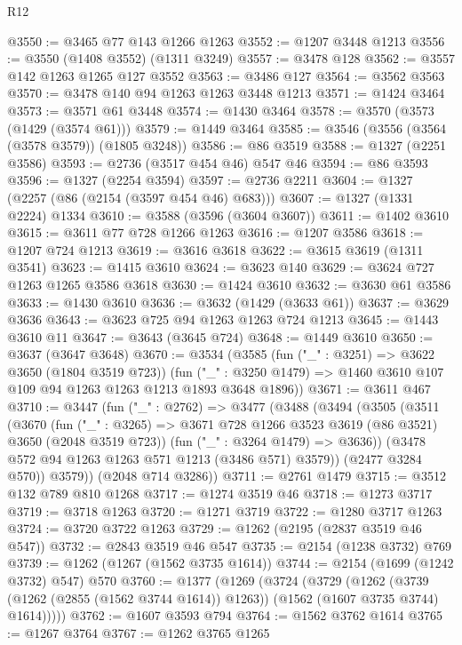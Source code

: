 \begin{lexlean}{R12}
\begin{coremodule}
@3550 := @3465 @77 @143 @1266 @1263
@3552 := @1207 @3448 @1213
@3556 := @3550 (@1408 @3552) (@1311 @3249)
@3557 := @3478 @128
@3562 := @3557 @142 @1263 @1265 @127 @3552
@3563 := @3486 @127
@3564 := @3562 @3563
@3570 := @3478 @140 @94 @1263 @1263 @3448 @1213
@3571 := @1424 @3464
@3573 := @3571 @61 @3448
@3574 := @1430 @3464
@3578 := @3570 (@3573 (@1429 (@3574 @61)))
@3579 := @1449 @3464
@3585 := @3546 (@3556 (@3564 (@3578 @3579)) (@1805 @3248))
@3586 := @86 @3519
@3588 := @1327 (@2251 @3586)
@3593 := @2736 (@3517 @454 @46) @547 @46
@3594 := @86 @3593
@3596 := @1327 (@2254 @3594)
@3597 := @2736 @2211
@3604 := @1327 (@2257 (@86 (@2154 (@3597 @454 @46) @683)))
@3607 := @1327 (@1331 @2224) @1334
@3610 := @3588 (@3596 (@3604 @3607))
@3611 := @1402 @3610
@3615 := @3611 @77 @728 @1266 @1263
@3616 := @1207 @3586
@3618 := @1207 @724 @1213
@3619 := @3616 @3618
@3622 := @3615 @3619 (@1311 @3541)
@3623 := @1415 @3610
@3624 := @3623 @140
@3629 := @3624 @727 @1263 @1265 @3586 @3618
@3630 := @1424 @3610
@3632 := @3630 @61 @3586
@3633 := @1430 @3610
@3636 := @3632 (@1429 (@3633 @61))
@3637 := @3629 @3636
@3643 := @3623 @725 @94 @1263 @1263 @724 @1213
@3645 := @1443 @3610 @11
@3647 := @3643 (@3645 @724)
@3648 := @1449 @3610
@3650 := @3637 (@3647 @3648)
@3670 := @3534
    (@3585
      (fun ("_" : @3251) => @3622 @3650 (@1804 @3519 @723))
      (fun ("_" : @3250 @1479) => @1460 @3610 @107 @109 @94 @1263 @1263 @1213 @1893 @3648 @1896))
@3671 := @3611 @467
@3710 := @3447
    (fun ("_" : @2762) =>
    @3477
      (@3488
        (@3494
          (@3505
            (@3511
              (@3670
                (fun ("_" : @3265) =>
                @3671 @728 @1266 @3523 @3619 (@86 @3521) @3650 (@2048 @3519 @723))
                (fun ("_" : @3264 @1479) => @3636))
              (@3478 @572 @94 @1263 @1263 @571 @1213 (@3486 @571) @3579))
            (@2477 @3284 @570))
          @3579))
      (@2048 @714 @3286))
@3711 := @2761 @1479
@3715 := @3512 @132 @789 @810 @1268
@3717 := @1274 @3519 @46
@3718 := @1273 @3717
@3719 := @3718 @1263
@3720 := @1271 @3719
@3722 := @1280 @3717 @1263
@3724 := @3720 @3722 @1263
@3729 := @1262 (@2195 (@2837 @3519 @46 @547))
@3732 := @2843 @3519 @46 @547
@3735 := @2154 (@1238 @3732) @769
@3739 := @1262 (@1267 (@1562 @3735 @1614))
@3744 := @2154 (@1699 (@1242 @3732) @547) @570
@3760 := @1377
    (@1269
      (@3724
        (@3729
          (@1262
            (@3739 (@1262 (@2855 (@1562 @3744 @1614)) @1263))
            (@1562 (@1607 @3735 @3744) @1614)))))
@3762 := @1607 @3593 @794
@3764 := @1562 @3762 @1614
@3765 := @1267 @3764
@3767 := @1262 @3765 @1265

\end{coremodule}
\end{lexlean}
